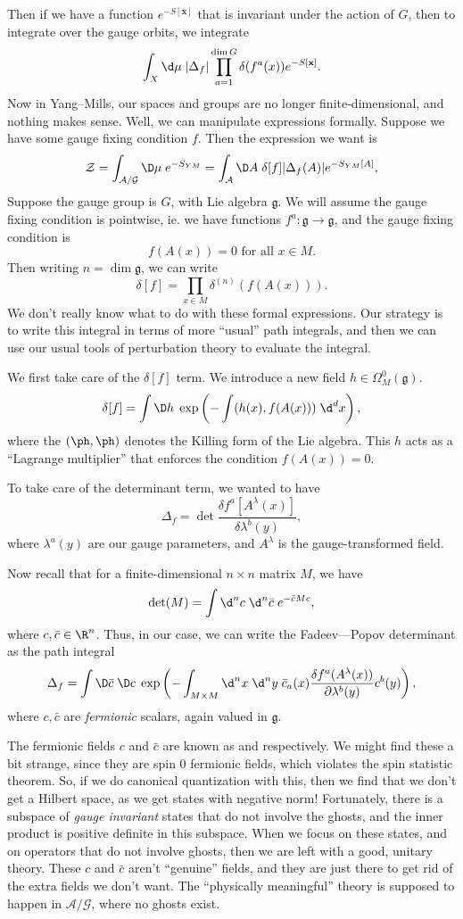 \documentclass[a4paper]{article}
\begin{document}
Then if we have a function $e^{-S[\mathbf{x}]}$ that is invariant under the action of $G$, then to integrate over the gauge orbits, we integrate
\[
  \int_X \d \mu\; |\Delta_f| \prod_{a = 1}^{\dim G} \delta(f^a(x)) e^{-S[\mathbf{x}]}.
\]
Now in Yang--Mills, our spaces and groups are no longer finite-dimensional, and nothing makes sense. Well, we can manipulate expressions formally. Suppose we have some gauge fixing condition $f$. Then the expression we want is
\[
  \mathcal{Z} = \int_{\mathcal{A}/\mathcal{G}} \D \mu \; e^{-S_{YM}} = \int_\mathcal{A} \D A\; \delta[f] |\Delta_f(A)| e^{-S_{YM}[A]},
\]
Suppose the gauge group is $G$, with Lie algebra $\mathfrak{g}$. We will assume the gauge fixing condition is pointwise, ie. we have functions $f^a: \mathfrak{g} \to \mathfrak{g}$, and the gauge fixing condition is
\[
  f(A(x)) = 0\text{ for all } x\in M.
\]
Then writing $n = \dim \mathfrak{g}$, we can write
\[
  \delta[f] = \prod_{x \in M} \delta^{(n)}(f(A(x))).
\]
We don't really know what to do with these formal expressions. Our strategy is to write this integral in terms of more ``usual'' path integrals, and then we can use our usual tools of perturbation theory to evaluate the integral.

We first take care of the $\delta[f]$ term. We introduce a new field $h \in \Omega^0_M(\mathfrak{g})$.
\[
  \delta[f] = \int \D h\; \exp\left(-\int (h(x), f(A(x)))\;\d^d x\right),
\]
where the $(\ph, \ph)$ denotes the Killing form of the Lie algebra. This $h$ acts as a ``Lagrange multiplier'' that enforces the condition $f(A(x)) = 0$.

To take care of the determinant term, we wanted to have
\[
  \Delta_f = \det \frac{\delta f^a[A^\lambda(x)]}{\delta \lambda^b (y)},
\]
where $\lambda^a(y)$ are our gauge parameters, and $A^\lambda$ is the gauge-transformed field.

Now recall that for a finite-dimensional $n \times n$ matrix $M$, we have
\[
  \det (M) = \int \d^n c\; \d^n \bar{c}\; e^{- \bar{c} M c},
\]
where $c, \bar{c} \in \R^n$. Thus, in our case, we can write the Fadeev---Popov determinant as the path integral
\[
  \Delta_f = \int \D \bar{c}\; \D c\;\exp \left(- \int_{M \times M} \d^n x\;\d^n y\; \bar{c}_a(x) \frac{\delta f^a(A^\lambda(x))}{\partial \lambda^b(y)} c^b(y)\right),
\]
where $c, \bar{c}$ are \emph{fermionic} scalars, again valued in $\mathfrak{g}$.

The fermionic fields $c$ and $\bar{c}$ are known as  and  respectively. We might find these a bit strange, since they are spin $0$ fermionic fields, which violates the spin statistic theorem. So, if we do canonical quantization with this, then we find that we don't get a Hilbert space, as we get states with negative norm! Fortunately, there is a subspace of \emph{gauge invariant} states that do not involve the ghosts, and the inner product is positive definite in this subspace. When we focus on these states, and on operators that do not involve ghosts, then we are left with a good, unitary theory. These $c$ and $\bar{c}$ aren't ``genuine'' fields, and they are just there to get rid of the extra fields we don't want. The ``physically meaningful'' theory is supposed to happen in $\mathcal{A}/\mathcal{G}$, where no ghosts exist.
\end{document}
